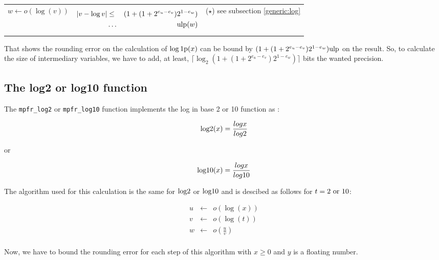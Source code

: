 \documentclass[12pt]{amsart}
\def\n{\textnormal}
\def\ulp{{\rm ulp}}
\begin{document}
\begin{center}
\begin{tabular}{l l l}
\begin{minipage}{2.5cm}
$w \leftarrow o(\log(v)) $

\end{minipage} &
\begin{minipage}{7.5cm}
\begin{eqnarray}\nonumber
  |v-\log{v}| &\leq& (1+(1+2^{e_u-e_v})2^{1-e_w})\\\nonumber
 &\hdots& \ulp(w)
\end{eqnarray}
\end{minipage} &
\begin{minipage}{6cm}
($\star$)
see subsection \ref{generic:log}
\end{minipage}
\end{tabular}
\end{center}


That shows the rounding error on the calculation of $\log\n{1p}(x)$
can be bound by $(1+(1+2^{e_u-e_v})2^{1-e_w}) \ulp$ on the result. So,
to calculate the size of intermediary variables, we have to add, at
least, $\lceil \log_2 (1+(1+2^{e_u-e_v})2^{1-e_w}) \rceil$ bits the wanted
precision.


\subsection{The log2 or log10 function}

The {\tt mpfr\_log2} or {\tt mpfr\_log10} function implements the log in base 2 or 10 function  as :

\[
\textnormal{log2} (x) = \frac{log{x}}{log{2}}
\]

or

\[
\textnormal{log10} (x) = \frac{log{x}}{log{10}}
\]


The algorithm used for this calculation is the same for $\n{log2}$ or
$\n{log10}$ and is descibed as follows for $t=2 \n{ or } 10$:

\begin{eqnarray}\nonumber
u&\leftarrow&o(\log(x))\\\nonumber
v&\leftarrow&o(\log(t))\\\nonumber
w&\leftarrow&o(\frac{u}{v})\\\nonumber
\end{eqnarray}

Now, we have to bound the rounding error for each step of this
algorithm with $x \geq 0$ and $y$ is a floating number.
\end{document}
